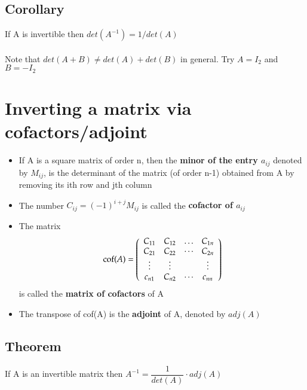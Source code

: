 \documentclass{article}[18pt]
\begin{document}
\subsection{Corollary}
If A is invertible then $det(A^{-1})=1/det(A)$\\
\\
Note that $det(A+B)\neq det(A)+det(B)$ in general. Try $A=I_2$ and $B=-I_2$
\section{Inverting a matrix via cofactors/adjoint}
\begin{itemize}
	\item If A is a square matrix of order n, then the \textbf{minor of the entry $a_{ij}$} denoted by $M_{ij}$, is the determinant of the matrix (of order n-1) obtained from A by removing its ith row and jth column
	\item The number $C _ { i j } = ( - 1 ) ^ { i + j } M _ { i j }$ is called the \textbf{cofactor of $a_{ij}$}
	\item The matrix
	$$\operatorname { cof } ( A ) = \left( \begin{array} { c c c c } { C _ { 11 } } & { C _ { 12 } } & { \dots } & { C _ { 1 n } } \\ { C _ { 21 } } & { C _ { 22 } } & { \cdots } & { C _ { 2 n } } \\ { \vdots } & { \vdots } & { } & { \vdots } \\ { c _ { n 1 } } & { C _ { n 2 } } & { \cdots } & { c _ { n n } } \end{array} \right)$$
	is called the \textbf{matrix of cofactors} of A
	\item The transpose of cof(A) is the \textbf{adjoint} of A, denoted by $adj(A)$
\end{itemize}
\subsection{Theorem}
If A is an invertible matrix then $A^{-1}=\dfrac{1}{det(A)}\cdot adj(A)$
\end{document}
